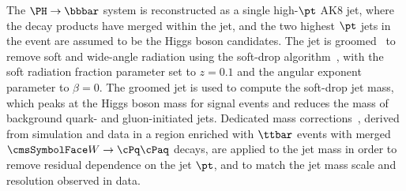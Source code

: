The $\PH \to \bbbar$ system is reconstructed as a single high-$\pt$
AK8 jet, where the decay products have merged within the jet, and the two
highest $\pt$ jets in the event are assumed to be the Higgs boson
candidates. The jet is groomed~\cite{Salam:2009jx} to remove soft and
wide-angle radiation using the soft-drop algorithm~\cite{Dasgupta:2013ihk,Larkoski:2014wba}, with the soft radiation fraction parameter set to $z= 0.1$ and the angular
exponent parameter to $\beta = 0$. The groomed jet is used
to compute the soft-drop jet mass, which peaks at the Higgs boson mass
for signal events and reduces the mass of background quark- and
gluon-initiated jets. Dedicated mass
corrections~\cite{CMS-PAS-JME-16-003}, derived from simulation and
data in a region enriched with $\ttbar$ events with merged
$\PW \to \qqbar$ decays, are applied to the jet mass in order to remove
residual dependence on the jet $\pt$, and to match the jet mass scale
and resolution observed in data.


